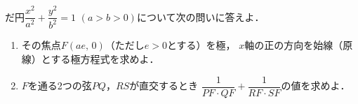 \documentclass[../../main.tex]{subfiles}
\begin{document}
だ円$\displaystyle\dfrac{x^2}{a^2}+\dfrac{y^2}{b^2}=1$ $(a>b>0)$について次の問いに答えよ．
\begin{enumerate}
  \item その焦点$F(ae, \, 0)$（ただし$e>0$とする）を極，
    $x$軸の正の方向を始線（原線）とする極方程式を求めよ．
  \item $F$を通る2つの弦$PQ$，$RS$が直交するとき
    $\displaystyle\dfrac{1}{PF \cdot QF}+\dfrac{1}{RF \cdot SF}$の値を求めよ．
\end{enumerate}
\end{document}
